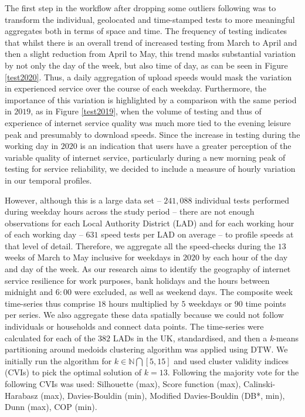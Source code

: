 \documentclass[Royal,times,sageh]{sagej}
\begin{document}
The first step in the workflow after dropping some outliers following
\citet{riddlesden2014broadband} was to transform the individual,
geolocated and time-stamped tests to more meaningful aggregates both in
terms of space and time. The frequency of testing indicates that whilst
there is an overall trend of increased testing from March to April and
then a slight reduction from April to May, this trend masks substantial
variation by not only the day of the week, but also time of day, as can
be seen in Figure \ref{test2020}. Thus, a daily aggregation of upload
speeds would mask the variation in experienced service over the course
of each weekday. Furthermore, the importance of this variation is
highlighted by a comparison with the same period in \(2019\), as in
Figure \ref{test2019}, when the volume of testing and thus of experience
of internet service quality was much more tied to the evening leisure
peak and presumably to download speeds. Since the increase in testing
during the working day in \(2020\) is an indication that users have a
greater perception of the variable quality of internet service,
particularly during a new morning peak of testing for service
reliability, we decided to include a measure of hourly variation in our
temporal profiles.

However, although this is a large data set -- \(241,088\) individual
tests performed during weekday hours across the study period -- there
are not enough observations for each Local Authority District (LAD) and
for each working hour of each working day -- \(631\) speed tests per LAD
on average -- to profile speeds at that level of detail. Therefore, we
aggregate all the speed-checks during the \(13\) weeks of March to May
inclusive for weekdays in \(2020\) by each hour of the day and day of
the week. As our research aims to identify the geography of internet
service resilience for work purposes, bank holidays and the hours
between midnight and \(6:00\) were excluded, as well as weekend days.
The composite week time-series thus comprise \(18\) hours multiplied by
\(5\) weekdays or \(90\) time points per series. We also aggregate these
data spatially because we could not follow individuals or households and
connect data points. The time-series were calculated for each of the
\(382\) LADs in the UK, standardised, and then a \emph{k}-means
partitioning around medoids clustering algorithm was applied using DTW.
We initially run the algorithm for \(k \in \mathbb{N} \bigcap [5,15]\)
and used cluster validity indices (CVIs) to pick the optimal solution of
\(k = 13\). Following \citet{sardatime} the majority vote for the
following CVIs was used: Silhouette (max), Score function (max),
Calinski-Harabasz (max), Davies-Bouldin (min), Modified Davies-Bouldin
(DB*, min), Dunn (max), COP (min).
\end{document}
